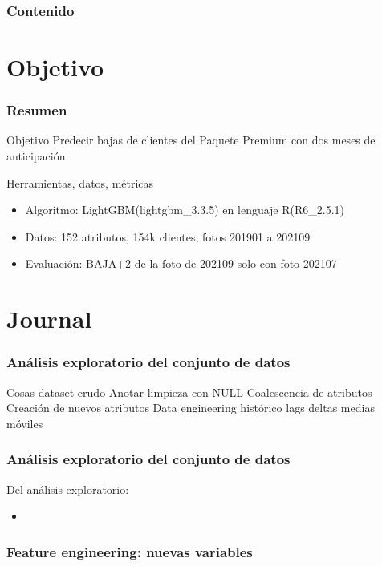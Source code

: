 \documentclass[aspectratio=43]{beamer}
\begin{document}
\begin{frame}
	\frametitle{Contenido}
	\tableofcontents
\end{frame}

\section{Objetivo}

\begin{frame}
	\frametitle{Resumen}
	\begin{block}{Objetivo}
		Predecir bajas de clientes del Paquete Premium con dos meses de anticipación 
	\end{block}
	\begin{block}{Herramientas, datos, métricas}
		\begin{itemize}
			\item Algoritmo: LightGBM(lightgbm\_3.3.5) en lenguaje R(R6\_2.5.1)
			\item Datos: 152 atributos, 154k clientes, fotos 201901 a 202109%
			\item Evaluación: BAJA+2 de la foto de 202109 solo con foto 202107
		\end{itemize}
	\end{block}
\end{frame}


\section{Journal}

\begin{frame}
	\frametitle{Análisis exploratorio del conjunto de datos}
Cosas
dataset crudo
Anotar limpieza con NULL
Coalescencia de atributos
Creación de nuevos atributos
Data engineering histórico
lags
deltas
medias móviles
\end{frame}


\begin{frame}
	\frametitle{Análisis exploratorio del conjunto de datos}
	Del análisis exploratorio:
	\begin{itemize}
		\item 
	\end{itemize}
\end{frame}


\begin{frame}
	\frametitle{Feature engineering: nuevas variables}
	

\end{frame}
\end{document}
